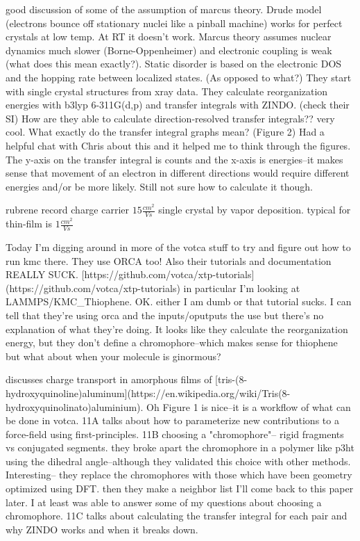 \documentclass{article}
\begin{document}
good discussion of some of the assumption of marcus theory. 
Drude model (electrons bounce off stationary nuclei like a pinball machine) works for perfect crystals at low temp.
At RT it doesn't work. Marcus theory assumes nuclear dynamics much slower (Borne-Oppenheimer) and electronic coupling is weak (what does this mean exactly?). Static disorder is based on the electronic DOS and the hopping rate between localized states. (As opposed to what?)
They start with single crystal structures from xray data. They calculate reorganization energies with b3lyp 6-311G(d,p) and transfer integrals with ZINDO. (check their SI)
How are they able to calculate direction-resolved transfer integrals?? very cool. What exactly do the transfer integral graphs mean? (Figure 2) Had a helpful chat with Chris about this and it helped me to think through the figures. The y-axis on the transfer integral is counts and the x-axis is energies--it makes sense that movement of an electron in different directions would require different energies and/or be more likely. Still not sure how to calculate it though. 

\cite{Vehoff2010a}

rubrene record charge carrier $15 \frac{cm^{2}}{V s}$ single crystal by vapor deposition. typical for thin-film is $1 \frac{cm^{2}}{V s}$

Today I'm digging around in more of the votca stuff to try and figure out how to run kmc there. They use ORCA too! Also their tutorials and documentation REALLY SUCK. [https://github.com/votca/xtp-tutorials](https://github.com/votca/xtp-tutorials) in particular I'm looking at LAMMPS/KMC\_Thiophene.
OK. either I am dumb or that tutorial sucks. I can tell that they're using orca and the inputs/oputputs the use but there's no explanation of what they're doing. It looks like they calculate the reorganization energy, but they don't define a chromophore--which makes sense for thiophene but what about when your molecule is ginormous?

\cite{Ruhle2011b} 

discusses charge transport in amorphous films of [tris-(8-hydroxyquinoline)aluminum](https://en.wikipedia.org/wiki/Tris(8-hydroxyquinolinato)aluminium). Oh Figure 1 is nice--it is a workflow of what can be done in votca.
11A talks about how to parameterize new contributions to a force-field using first-principles.
11B choosing a "chromophore"-- rigid fragments vs conjugated segments. they broke apart the chromophore in a polymer like p3ht using the dihedral angle--although they validated this choice with other methods. Interesting-- they replace the chromophores with those which have been geometry optimized using DFT. then they make a neighbor list
I'll come back to this paper later. I at least was able to answer some of my questions about choosing a chromophore.
11C talks about calculating the transfer integral for each pair and why ZINDO works and when it breaks down.
\end{document}
